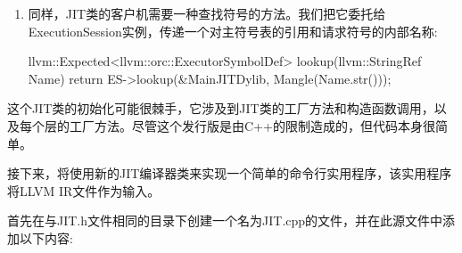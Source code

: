 \begin{enumerate}
\item
同样，JIT类的客户机需要一种查找符号的方法。我们把它委托给ExecutionSession实例，传递一个对主符号表的引用和请求符号的内部名称:

\begin{cpp}
    llvm::Expected<llvm::orc::ExecutorSymbolDef>
    lookup(llvm::StringRef Name) {
        return ES->lookup({&MainJITDylib},
                            Mangle(Name.str()));
    }
\end{cpp}
\end{enumerate}

这个JIT类的初始化可能很棘手，它涉及到JIT类的工厂方法和构造函数调用，以及每个层的工厂方法。尽管这个发行版是由C++的限制造成的，但代码本身很简单。

接下来，将使用新的JIT编译器类来实现一个简单的命令行实用程序，该实用程序将LLVM IR文件作为输入。


首先在与JIT.h文件相同的目录下创建一个名为JIT.cpp的文件，并在此源文件中添加以下内容:

